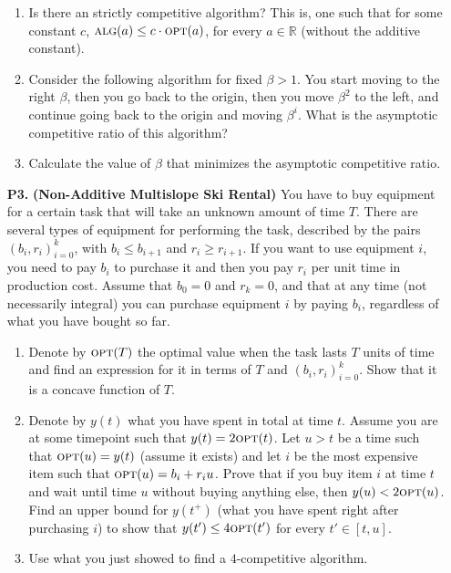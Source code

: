 \documentclass[11pt, spanish]{article}
\theoremstyle{plain}
\newcommand{\R}{\mathds{R}}
\newcommand{\OPT}{\textsc{opt}}
\newcommand{\ALG}{\textsc{alg}}
\begin{document}
\begin{itemize}
  \begin{enumerate}
    \item Is there an strictly competitive algorithm? This is, one such
      that for some constant $c$, $\ALG(a) \leq c\cdot \OPT(a)$, for every
      $a \in \R$ (without the additive constant).
     
    \item Consider the following algorithm for fixed $\beta>1$. You
      start moving to the right $\beta$, then you go back to the origin,
      then you move $\beta^2$ to the left, and continue going back to the
      origin and moving $\beta^i$. What is the asymptotic competitive ratio of this 
      algorithm?

    \item Calculate the value of $\beta$ that minimizes the asymptotic competitive ratio.
  
  \end{enumerate}
  
  \item[\textbf{P3.}] \textbf{(Non-Additive Multislope Ski Rental)}
    You have to buy equipment for a certain task that will take an
    unknown amount of time $T$. There are several types of equipment for performing the task, described by
    the pairs $(b_i,r_i)_{i=0}^k$, with $b_i\leq b_{i+1}$ and $r_i \geq r_{i+1}$.
    If you want to use equipment $i$, you need to pay $b_i$ to purchase it and then you pay $r_i$ per unit time in production cost.
    Assume that $b_0=0$ and $r_k=0$, and that at any time (not necessarily
    integral) you can purchase equipment  $i$ by paying $b_i$, regardless
    of what you have bought so far.
    
\begin{enumerate}
  \item Denote by $\OPT(T)$ the optimal value when
    the task lasts $T$ units of time and find an expression for
    it in terms of $T$ and $(b_i,r_i)_{i=0}^k$. 
    Show that it is a concave function of $T$.
      
    \item Denote by $y(t)$ what you have spent in total at time $t$.
      Assume you are at some timepoint such that $y(t)=2\OPT(t)$. Let
      $u>t$ be a time such that $\OPT(u)= y(t)$ (assume it exists)
      and let $i$ be the most
      expensive item such that $\OPT(u)= b_i + r_i u$. Prove that if you buy
      item $i$ at time $t$ and wait until time $u$ without buying anything
      else, then $y(u)< 2\OPT(u)$. Find an upper bound for $y(t^+)$ (what
      you have spent right after purchasing $i$) to
      show that $y(t') \leq 4 \OPT(t')$ for every $t'\in [t,u]$.
      


    \item Use what you just showed to find a $4$-competitive algorithm. 

  \end{enumerate}




\end{itemize}
\end{document}
